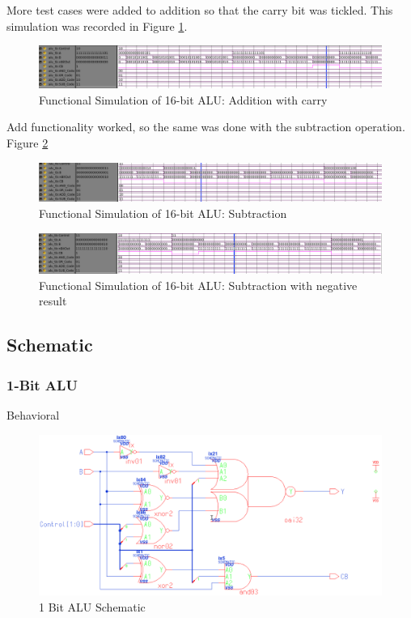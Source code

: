 \documentclass[11pt]{article}
\begin{document}
			More test cases were added to addition so that the carry bit was tickled. This simulation was recorded in Figure \ref{fig:16-bit-alu-add-carry}.
			
			\begin{figure}[H]
				\centering
				\includegraphics[width=0.7\linewidth]{"Pictures/16 Bit ALU Add Carry"}
				\caption{Functional Simulation of 16-bit ALU: Addition with carry}
				\label{fig:16-bit-alu-add-carry}
			\end{figure}
			
			Add functionality worked, so the same was done with the subtraction operation. Figure \ref{fig:16-bit-alu-sub-pos}
			
			\begin{figure}[H]
				\centering
				\includegraphics[width=0.7\linewidth]{"Pictures/16 Bit Alu Sub Pos"}
				\caption{Functional Simulation of 16-bit ALU: Subtraction}
				\label{fig:16-bit-alu-sub-pos}
			\end{figure}
			
			
			\begin{figure}[H]
				\centering
				\includegraphics[width=0.7\linewidth]{"Pictures/16 Bit ALU Sub Neg"}
				\caption{Functional Simulation of 16-bit ALU: Subtraction with negative result}
				\label{fig:16-bit-alu-sub-neg}
			\end{figure}

	\subsection{Schematic}

		\subsubsection{1-Bit ALU}	
		
			
			Behavioral
			
			\begin{figure}[H]
				\centering
				\includegraphics[width=0.4\linewidth]{"Pictures/ALU-1Bit Schematic"}
				\caption{1 Bit ALU Schematic}
				\label{fig:alu-1bit-schematic}
			\end{figure}
		
\end{document}
